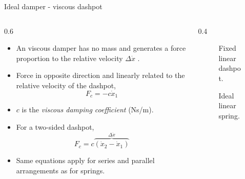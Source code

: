 \documentclass[11pt,aspectratio=169,handout]{beamer}
\begin{document}
\begin{frame}[c]{Ideal damper - viscous dashpot}
	\begin{columns}[T]
		\begin{column}{0.6\textwidth}
			\begin{itemize}
				\item An viscous damper  has no mass and generates a force proportion to the relative velocity $\Delta \dot{x}$ .  
				\item Force in opposite direction and linearly related to the relative velocity of the dashpot,
				\begin{equation}
					F_c = -c\dot{x}_1
				\end{equation}
				\item $c$ is  the \textit{viscous damping coefficient} (Ns/m).
				\item For a two-sided dashpot,
				\begin{equation}
					F_c = c\overbrace{(\dot{x}_2-\dot{x}_1)}^{\Delta \dot{x}}
				\end{equation}
			\item Same equations apply for series and parallel arrangements as for springs.
			\end{itemize}
		\end{column}
		\begin{column}{0.4\textwidth}
			\begin{figure}
				\centering
				
				\caption{Fixed linear dashpot.}
			\end{figure}
			\begin{figure}
				\centering
				
				\caption{Ideal linear spring.}
			\end{figure}
		\end{column}
	\end{columns}
\end{frame}
\end{document}

